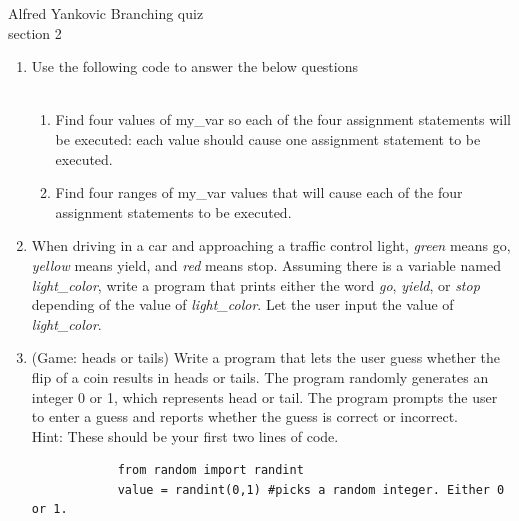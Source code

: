 \documentclass{article}
\begin{document}
\pagebreak
Alfred Yankovic \hfill Branching quiz\\
section 2\\
\begin{enumerate}
	\item 
		Use the following code to answer the below questions\\
		\mbox{ \hspace*{0.25in}	}
		\begin{enumerate}
			\item Find four values of my\_var so each of the four assignment statements will be executed: 
				each value should cause one assignment statement to be executed.
			\item Find four ranges of my\_var values that will cause each of the four assignment 
				statements to be executed.
		\end{enumerate}


	\item
		When driving in a car and approaching a traffic control light, \textit{green} means go, 
		\textit{yellow} means yield, and \textit{red} means stop.  Assuming there is a variable 
		named \textit{light\_color}, write a program that prints either the word \textit{go}, 
		\textit{yield}, or \textit{stop} depending of the value of \textit{light\_color}.  
		Let the user input the value of \textit{light\_color}.


	\item 
		(Game: heads or tails)  Write a program that lets the user guess whether the flip of a coin 
		results in heads or tails.  The program randomly generates an integer 0 or 1, which 
		represents head or tail.  The program prompts the user to enter a guess and reports whether 
		the guess is correct or incorrect.\\
		Hint: These should be your first two lines of code.
		\begin{verbatim}
		    from random import randint
		    value = randint(0,1) #picks a random integer. Either 0 or 1.
		\end{verbatim}



\end{enumerate}
\pagebreak
\end{document}
